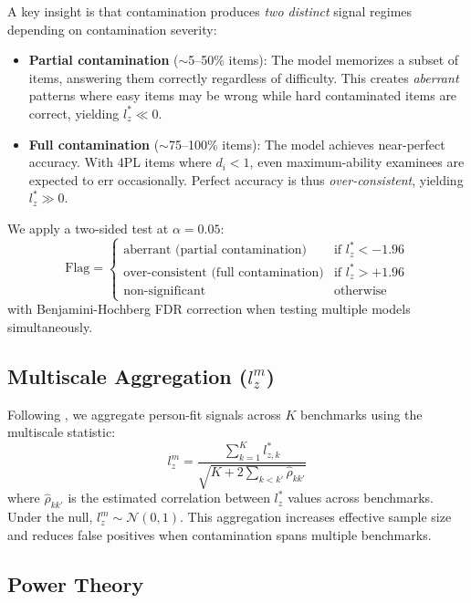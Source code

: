 \documentclass[11pt,a4paper]{article}
\begin{document}
A key insight is that contamination produces \emph{two distinct} signal regimes depending on contamination severity:

\begin{itemize}[nosep,leftmargin=*]
\item \textbf{Partial contamination} (${\sim}$5--50\% items): The model memorizes a subset of items, answering them correctly regardless of difficulty. This creates \emph{aberrant} patterns where easy items may be wrong while hard contaminated items are correct, yielding $l_z^* \ll 0$.
\item \textbf{Full contamination} (${\sim}$75--100\% items): The model achieves near-perfect accuracy. With 4PL items where $d_i < 1$, even maximum-ability examinees are expected to err occasionally. Perfect accuracy is thus \emph{over-consistent}, yielding $l_z^* \gg 0$.
\end{itemize}

We apply a two-sided test at $\alpha = 0.05$:
\begin{equation}
\text{Flag} = \begin{cases}
\text{aberrant (partial contamination)} & \text{if } l_z^* < -1.96 \\
\text{over-consistent (full contamination)} & \text{if } l_z^* > +1.96 \\
\text{non-significant} & \text{otherwise}
\end{cases}
\end{equation}
with Benjamini-Hochberg FDR correction when testing multiple models simultaneously.

\subsection{Multiscale Aggregation ($l_z^m$)}

Following \citet{hong2021multiscale}, we aggregate person-fit signals across $K$ benchmarks using the multiscale statistic:
\begin{equation}
l_z^m = \frac{\sum_{k=1}^{K} l_{z,k}^*}{\sqrt{K + 2\sum_{k<k'} \hat{\rho}_{kk'}}}
\end{equation}
where $\hat{\rho}_{kk'}$ is the estimated correlation between $l_z^*$ values across benchmarks. Under the null, $l_z^m \sim \mathcal{N}(0,1)$. This aggregation increases effective sample size and reduces false positives when contamination spans multiple benchmarks.

\subsection{Power Theory}
\label{sec:power}
\end{document}
